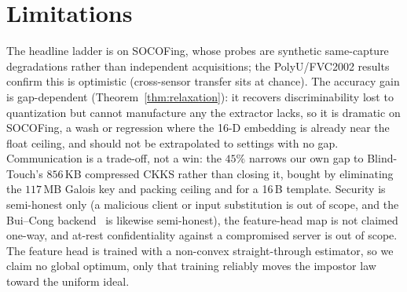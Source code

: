 \section{Limitations}
\label{sec:limitations}

The headline ladder is on SOCOFing, whose probes are synthetic same-capture degradations rather than
independent acquisitions; the PolyU/FVC2002 results confirm this is optimistic (cross-sensor transfer
sits at chance). The accuracy gain is gap-dependent (Theorem~\ref{thm:relaxation}): it recovers
discriminability lost to quantization but cannot manufacture any the extractor lacks, so it is dramatic
on SOCOFing, a wash or regression where the 16-D embedding is already near the float ceiling, and
should not be extrapolated to settings with no gap. Communication is a trade-off, not a win: the $45\%$
narrows our own gap to Blind-Touch's $856$\,KB compressed CKKS rather than closing it, bought by
eliminating the $117$\,MB Galois key and packing ceiling and for a 16\,B template. Security is
semi-honest only (a malicious client or input substitution is out of scope, and the Bui--Cong
backend~\cite{BuiCong25} is likewise semi-honest), the feature-head map is not claimed one-way, and
at-rest confidentiality against a compromised server is out of scope. The feature head is trained with
a non-convex straight-through estimator, so we claim no global optimum, only that training reliably
moves the impostor law toward the uniform ideal.
